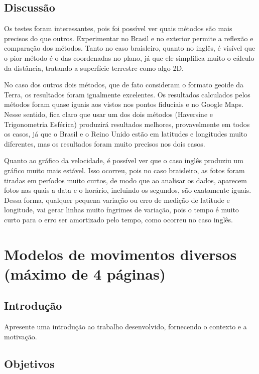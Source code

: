 \documentclass{article}
\begin{document}
\subsection{Discussão}

\qquad Os testes foram interessantes, pois foi possível ver quais métodos são mais precisos do que outros. Experimentar no Brasil e no exterior permite a reflexão e comparação dos métodos. Tanto no caso braisleiro, quanto no inglês, é visível que o pior método é o das coordenadas no plano, já que ele simplifica muito o cálculo da distância, tratando a superfície terrestre como algo 2D.

\qquad No caso dos outros dois métodos, que de fato consideram o formato geoide da Terra, os resultados foram igualmente excelentes. Os resultados calculados pelos métodos foram quase iguais aos vistos nos pontos fiduciais e no Google Maps. Nesse sentido, fica claro que usar um dos dois métodos (Haversine e Trigonometria Esférica) produzirá resultados melhores, provavelmente em todos os casos, já que o Brasil e o Reino Unido estão em latitudes e longitudes muito diferentes, mas os resultados foram muito precisos nos dois casos.

\qquad Quanto ao gráfico da velocidade, é possível ver que o caso inglês produziu um gráfico muito mais estável. Isso ocorreu, pois no caso braisleiro, as fotos foram tiradas em períodos muito curtos, de modo que ao analisar os dados, aparecem fotos nas quais a data e o horário, incluindo os segundos, são exatamente iguais. Dessa forma, qualquer pequena variação ou erro de medição de latitude e longitude, vai gerar linhas muito íngrimes de variação, pois o tempo é muito curto para o erro ser amortizado pelo tempo, como ocorreu no caso inglês.

\newpage

\section{Modelos de movimentos diversos (máximo de 4 páginas)}

\subsection{Introdução}

Apresente uma introdução ao trabalho desenvolvido, fornecendo o contexto e a motivação.

\subsection{Objetivos}
\end{document}
